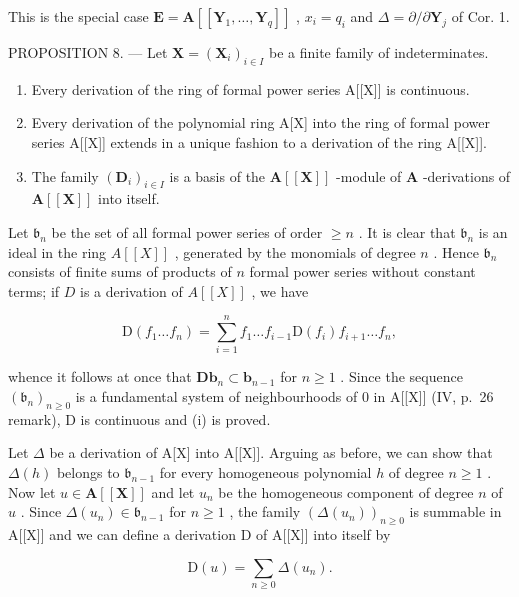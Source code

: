 This is the special case \(\mathbf{E} = \mathbf{A}[[\mathbf{Y}_1,\dots ,\mathbf{Y}_q]]\) , \(x_{i} = q_{i}\) and \(\Delta = \partial /\partial \mathbf{Y}_j\) of Cor. 1.

PROPOSITION 8. --- Let \(\mathbf{X} = (\mathbf{X}_i)_{i\in I}\) be a finite family of indeterminates.

\begin{enumerate}
\def\labelenumi{(\roman{enumi})}
\item
  Every derivation of the ring of formal power series A{[}{[}X{]}{]} is continuous.
\item
  Every derivation of the polynomial ring A{[}X{]} into the ring of formal power series A{[}{[}X{]}{]} extends in a unique fashion to a derivation of the ring A{[}{[}X{]}{]}.
\item
  The family \((\mathbf{D}_i)_{i\in I}\) is a basis of the \(\mathbf{A}[[\mathbf{X}]]\) -module of \(\mathbf{A}\) -derivations of \(\mathbf{A}[[\mathbf{X}]]\) into itself.
\end{enumerate}

Let \(\mathfrak{b}_n\) be the set of all formal power series of order \(\geqslant n\) . It is clear that \(\mathfrak{b}_n\) is an ideal in the ring \(A[[X]]\) , generated by the monomials of degree \(n\) . Hence \(\mathfrak{b}_n\) consists of finite sums of products of \(n\) formal power series without constant terms; if \(D\) is a derivation of \(A[[X]]\) , we have

\[
\mathrm{D} (f _ {1} \dots f _ {n}) = \sum_ {i = 1} ^ {n} f _ {1} \dots f _ {i - 1} \mathrm{D} (f _ {i}) f _ {i + 1} \dots f _ {n},
\]

whence it follows at once that \(\mathbf{Db}_{n} \subset \mathbf{b}_{n-1}\) for \(n \geqslant 1\) . Since the sequence \((\mathfrak{b}_n)_{n \geqslant 0}\) is a fundamental system of neighbourhoods of 0 in A{[}{[}X{]}{]} (IV, p.~26 remark), D is continuous and (i) is proved.

Let \(\Delta\) be a derivation of A{[}X{]} into A{[}{[}X{]}{]}. Arguing as before, we can show that \(\Delta(h)\) belongs to \(\mathfrak{b}_{n-1}\) for every homogeneous polynomial \(h\) of degree \(n \geqslant 1\) . Now let \(u \in \mathbf{A}[[\mathbf{X}]]\) and let \(u_n\) be the homogeneous component of degree \(n\) of \(u\) . Since \(\Delta(u_n) \in \mathfrak{b}_{n-1}\) for \(n \geqslant 1\) , the family \((\Delta(u_n))_{n \geqslant 0}\) is summable in A{[}{[}X{]}{]} and we can define a derivation D of A{[}{[}X{]}{]} into itself by

\[
\mathrm{D} (u) = \sum_ {n \geqslant 0} \Delta \left(u _ {n}\right).
\]

